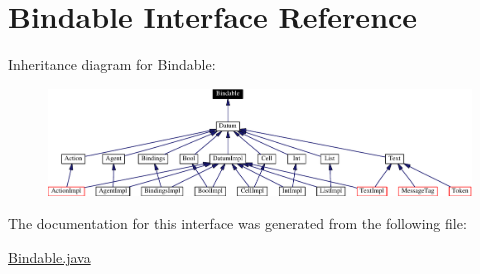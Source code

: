 \hypertarget{interfaceBindable}{
\section{Bindable  Interface Reference}
\label{interfaceBindable}
}
Inheritance diagram for Bindable:\begin{figure}[H]
\begin{center}
\leavevmode
\includegraphics[width=344pt]{interfaceBindable__inherit__graph}
\end{center}
\end{figure}


The documentation for this interface was generated from the following file:\begin{CompactItemize}
\item 
\hyperlink{Bindable_8java-source}{Bindable.java}\end{CompactItemize}
